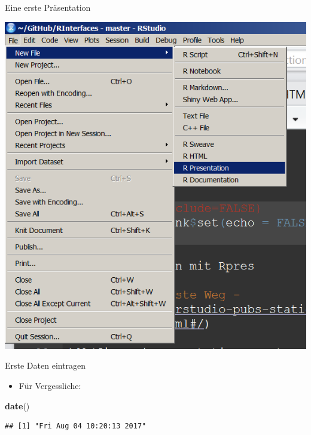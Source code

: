 \documentclass[ignorenonframetext,]{beamer}
\newenvironment{Shaded}{}{}
\newcommand{\KeywordTok}[1]{\textcolor[rgb]{0.00,0.44,0.13}{\textbf{{#1}}}}
\newcommand{\NormalTok}[1]{{#1}}
\providecommand{\tightlist}{%
\setlength{\itemsep}{0pt}\setlength{\parskip}{0pt}}
\begin{document}
\begin{frame}{Eine erste Präsentation}

\includegraphics{./tex2pdf.956/efff602422f4bc4b12bbb57ca2d3ec65e6ee4dc3.png}

\end{frame}

\begin{frame}[fragile]{Erste Daten eintragen}

\begin{itemize}
\tightlist
\item
  Für Vergessliche:
\end{itemize}

\begin{Shaded}
\begin{Highlighting}[]
\KeywordTok{date}\NormalTok{()}
\end{Highlighting}
\end{Shaded}

\begin{verbatim}
## [1] "Fri Aug 04 10:20:13 2017"
\end{verbatim}

\end{frame}
\end{document}
